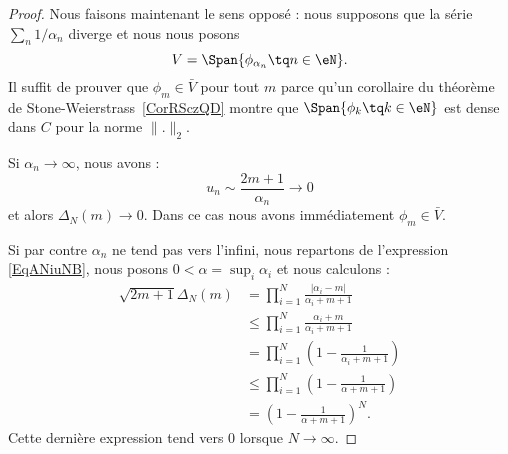 \begin{proof}
    Nous faisons maintenant le sens opposé : nous supposons que la série \( \sum_n1/\alpha_n\) diverge et nous nous posons
    \begin{equation}
        V=\Span\{ \phi_{\alpha_n}\tq n\in \eN \}.
    \end{equation}
    Il suffit de prouver que \( \phi_m\in \bar V\) pour tout \( m\) parce qu'un corollaire du théorème de Stone-Weierstrass~\ref{CorRSczQD} montre que \( \Span\{ \phi_k\tq k\in \eN \}\) est dense dans \( C\) pour la norme \( \| . \|_2\).

    Si \( \alpha_n\to \infty\), nous avons :
    \begin{equation}
        u_n\sim\frac{ 2m+1 }{ \alpha_n }\to 0
    \end{equation}
    et alors \( \Delta_N(m)\to 0\). Dans ce cas nous avons immédiatement \( \phi_m\in \bar V\).

    Si par contre \( \alpha_n\) ne tend pas vers l'infini, nous repartons de l'expression \eqref{EqANiuNB}, nous posons \( 0<\alpha=\sup_i\alpha_i\) et nous calculons :
    \begin{subequations}
        \begin{align}
            \sqrt{2m+1}\Delta_N(m)&=\prod_{i=1}^N\frac{ | \alpha_i-m | }{ \alpha_i+m+1 }\\
            &\leq \prod_{i=1}^N\frac{ \alpha_i+m }{ \alpha_i+m+1 }\\
            &=\prod_{i=1}^N\left( 1-\frac{ 1 }{ \alpha_i+m+1 } \right)\\
            &\leq \prod_{i=1}^N\left( 1-\frac{1}{ \alpha+m+1 } \right)\\
            &=\left( 1-\frac{1}{ \alpha+m+1 } \right)^N.
        \end{align}
    \end{subequations}
    Cette dernière expression tend vers \( 0\) lorsque \( N\to \infty\).
\end{proof}

